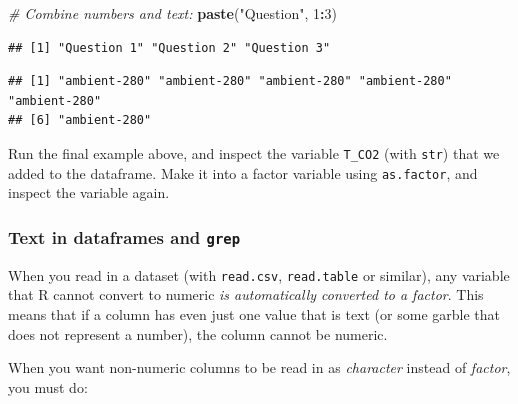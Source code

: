 \documentclass[]{book}
\newenvironment{Shaded}{\begin{snugshade}}{\end{snugshade}}
\newcommand{\CommentTok}[1]{\textcolor[rgb]{0.56,0.35,0.01}{\textit{#1}}}
\newcommand{\DataTypeTok}[1]{\textcolor[rgb]{0.13,0.29,0.53}{#1}}
\newcommand{\DecValTok}[1]{\textcolor[rgb]{0.00,0.00,0.81}{#1}}
\newcommand{\KeywordTok}[1]{\textcolor[rgb]{0.13,0.29,0.53}{\textbf{#1}}}
\newcommand{\NormalTok}[1]{#1}
\newcommand{\OperatorTok}[1]{\textcolor[rgb]{0.81,0.36,0.00}{\textbf{#1}}}
\newcommand{\StringTok}[1]{\textcolor[rgb]{0.31,0.60,0.02}{#1}}
\let\BeginKnitrBlock\begin \let\EndKnitrBlock\end
\begin{document}
\begin{Shaded}
\begin{Highlighting}[]
\CommentTok{# Combine numbers and text:}
\KeywordTok{paste}\NormalTok{(}\StringTok{"Question"}\NormalTok{, }\DecValTok{1}\OperatorTok{:}\DecValTok{3}\NormalTok{)}
\end{Highlighting}
\end{Shaded}

\begin{verbatim}
## [1] "Question 1" "Question 2" "Question 3"
\end{verbatim}

\begin{Shaded}
\end{Shaded}

\begin{verbatim}
## [1] "ambient-280" "ambient-280" "ambient-280" "ambient-280" "ambient-280"
## [6] "ambient-280"
\end{verbatim}

\BeginKnitrBlock{rmdtry}
Run the final example above, and inspect the variable \texttt{T\_CO2} (with \texttt{str}) that we added to the dataframe. Make it into a factor variable using \texttt{as.factor}, and inspect the variable again.
\EndKnitrBlock{rmdtry}

\hypertarget{textgrep}{%
\subsubsection{\texorpdfstring{Text in dataframes and \texttt{grep}}{Text in dataframes and grep}}\label{textgrep}}

When you read in a dataset (with \texttt{read.csv}, \texttt{read.table} or similar), any variable that R cannot convert to numeric \emph{is automatically converted to a factor}. This means that if a column has even just one value that is text (or some garble that does not represent a number), the column cannot be numeric.

When you want non-numeric columns to be read in as \emph{character} instead of \emph{factor}, you must do:
\end{document}
